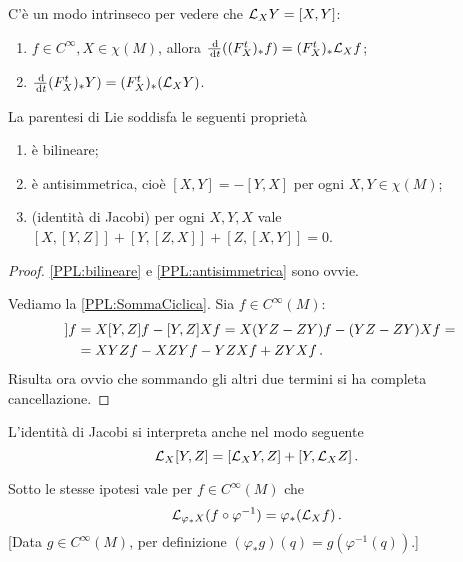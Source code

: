 \begin{remark}
	C'è un modo intrinseco per vedere che $\mathcal L_XY=[X,Y]$:
	\begin{enumerate}
	 \item $f\in C^\infty, X\in\chi(M)$, allora $\frac {\,\mathrm d}{\,\mathrm d t} ((F_X^t)_*f)=(F_X^t)_*\mathcal L_Xf$;
	 \item $\frac{\,\mathrm d}{\,\mathrm d t} (F_X^t)_*Y)=(F_X^t)_*(\mathcal L_XY)$.
	\end{enumerate}
\end{remark}

\begin{proposition}\label{prop:ProprietaParentesiLie}
	La parentesi di Lie soddisfa le seguenti proprietà
	\begin{enumerate}
	 \item è bilineare; \label{PPL:bilineare}
	 \item è antisimmetrica, cioè $[X,Y]=-[Y,X]$ per ogni $X,Y\in\chi(M)$; \label{PPL:antisimmetrica}
	 \item (identità di Jacobi) per ogni $X,Y,X$ vale $[X,[Y,Z]]+[Y,[Z,X]]+[Z,[X,Y]]=0$. \label{PPL:SommaCiclica}
	\end{enumerate}
\end{proposition}

\begin{proof}
	\ref{PPL:bilineare} e \ref{PPL:antisimmetrica} sono ovvie.
	
	Vediamo la \ref{PPL:SommaCiclica}. Sia $f\in C^\infty(M)$:
	\begin{align*}
		[X,[Y,Z]]f&=X[Y,Z]f-[Y,Z]Xf=X(YZ-ZY)f-(YZ-ZY)Xf=\\
		&= XYZf-XZYf-YZXf+ZYXf\punto
	\end{align*}
	Risulta ora ovvio che sommando gli altri due termini si ha completa cancellazione.
\end{proof}

\begin{remark}
	L'identità di Jacobi si interpreta anche nel modo seguente
	\begin{equation*}
		\mathcal L_X[Y,Z]=[\mathcal L_XY,Z]+[Y,\mathcal L_XZ]\, \text{. }
	\end{equation*}
\end{remark}


\begin{lemma}\label{lem:PushFunzioni}
	Sotto le stesse ipotesi vale per $f\in C^\infty(M)$ che
	\begin{equation*}
		\mathcal L_{\varphi_*X}(f\circ \varphi^{-1})=\varphi_*(\mathcal L_Xf)\, \text{. }
	\end{equation*}
	[Data $g\in C^\infty(M)$, per definizione $(\varphi_*g)(q)=g(\varphi^{-1}(q)).$]
\end{lemma}

